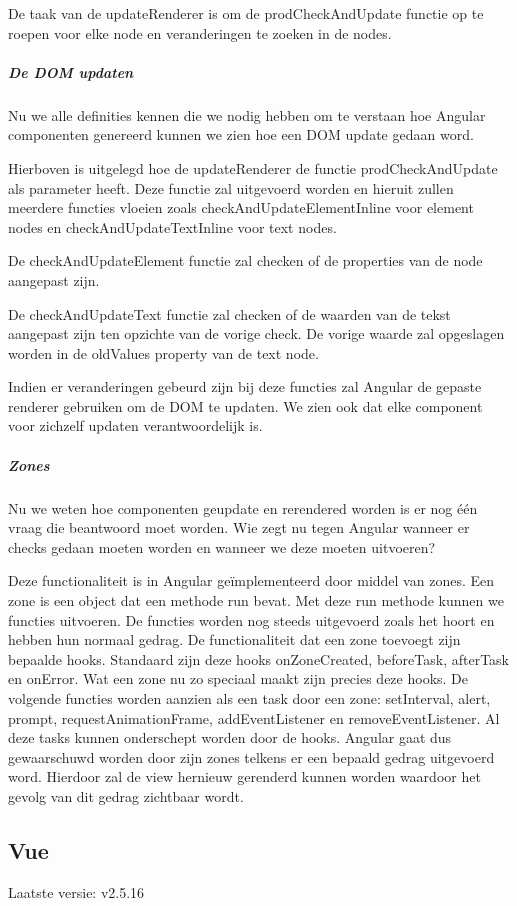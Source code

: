 De taak van de updateRenderer is om de prodCheckAndUpdate functie op te roepen voor elke node en veranderingen te zoeken in de nodes.

\subparagraph{De DOM updaten}
Nu we alle definities kennen die we nodig hebben om te verstaan hoe Angular componenten genereerd kunnen we zien hoe een DOM update gedaan word.

Hierboven is uitgelegd hoe de updateRenderer de functie prodCheckAndUpdate als parameter heeft. Deze functie zal uitgevoerd worden en hieruit zullen meerdere functies vloeien zoals checkAndUpdateElementInline voor element nodes en checkAndUpdateTextInline voor text nodes.

De checkAndUpdateElement functie zal checken of de properties van de node aangepast zijn.

De checkAndUpdateText functie zal checken of de waarden van de tekst aangepast zijn ten opzichte van de vorige check. De vorige waarde zal opgeslagen worden in de oldValues property van de text node.

Indien er veranderingen gebeurd zijn bij deze functies zal Angular de gepaste renderer gebruiken om de DOM te updaten. We zien ook dat elke component voor zichzelf updaten verantwoordelijk is.

\subparagraph{Zones}
Nu we weten hoe componenten geupdate en rerendered worden is er nog één vraag die beantwoord moet worden. Wie zegt nu tegen Angular wanneer er checks gedaan moeten worden en wanneer we deze moeten uitvoeren?

Deze functionaliteit is in Angular geïmplementeerd door middel van zones. Een zone is een object dat een methode run bevat. Met deze run methode kunnen we functies uitvoeren. De functies worden nog steeds uitgevoerd zoals het hoort en hebben hun normaal gedrag. De functionaliteit dat een zone toevoegt zijn bepaalde hooks. Standaard zijn deze hooks onZoneCreated, beforeTask, afterTask en onError. Wat een zone nu zo speciaal maakt zijn precies deze hooks. De volgende functies worden aanzien als een task door een zone: setInterval, alert, prompt, requestAnimationFrame, addEventListener en removeEventListener. Al deze tasks kunnen onderschept worden door de hooks. Angular gaat dus gewaarschuwd worden door zijn zones telkens er een bepaald gedrag uitgevoerd word. Hierdoor zal de view hernieuw gerenderd kunnen worden waardoor het gevolg van dit gedrag zichtbaar wordt.

\subsection{Vue}
\label{sec:JavaScript_Frameworks_Vue}
Laatste versie: v2.5.16


